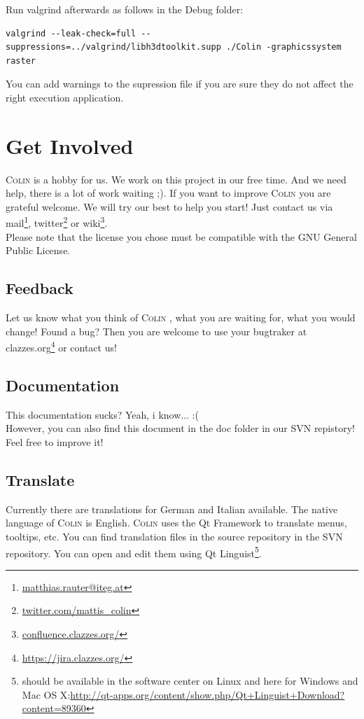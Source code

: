 \documentclass[a4paper,11pt]{report}
\newcommand{\Colin}[0]{\textsc{Colin }}
\begin{document}
Run valgrind afterwards as follows in the Debug folder:
\begin{lstlisting}[frame=single, breaklines=true, basicstyle=\small]
valgrind --leak-check=full --suppressions=../valgrind/libh3dtoolkit.supp ./Colin -graphicssystem raster
\end{lstlisting}

You can add warnings to the supression file if you are sure they do not affect the right execution application.



\chapter{Get Involved}
\label{cha:involved}

\Colin is a hobby for us. We work on this project in our free time. And we need help, there is a lot of work waiting ;). If you want to improve \Colin you are grateful welcome. We will try our best to help you start! Just contact us via mail\footnote{\href{mailto:matthias.rauter@iteg.at}{matthias.rauter@iteg.at}}, twitter\footnote{\url{twitter.com/mattis_colin}} or wiki\footnote{\url{confluence.clazzes.org/}}.\\
Please note that the license you chose must be compatible with the GNU General Public License.


\section{Feedback}
Let us know what you think of \Colin, what you are waiting for, what you would change! Found a bug?
Then you are welcome to use your bugtraker at clazzes.org\footnote{\url{https://jira.clazzes.org/}} or contact us!

\section{Documentation}
This documentation sucks? Yeah, i know... :(\\
However, you can also find this document in the doc folder in our SVN repistory! Feel free to improve it!

\section{Translate}
Currently there are translations for German and Italian available. The native language of \Colin is English.
\Colin uses the Qt Framework to translate menus, tooltips, etc. You can find translation files in the source repository in the SVN repository. You can open and edit them using Qt Linguist\footnote{should be available in the software center on Linux and here for Windows and Mac OS X:\url{http://qt-apps.org/content/show.php/Qt+Linguist+Download?content=89360}}.
\end{document}
